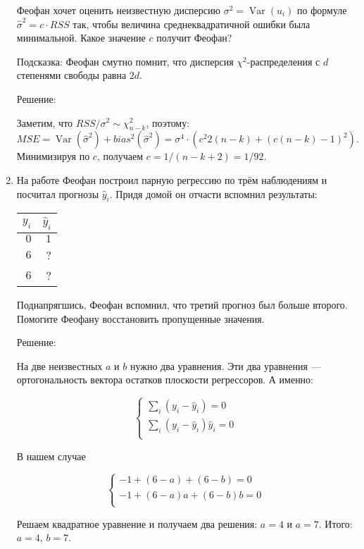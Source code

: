 \documentclass[12pt]{article} %
\DeclareMathOperator{\Var}{Var}
\def \hy{\hat{y}}
\begin{document}
\begin{enumerate}
Феофан хочет оценить неизвестную дисперсию $\sigma^2=\Var(u_i)$ по формуле $\hat{\sigma}^2 = c\cdot RSS$ так, чтобы величина среднеквадратичной ошибки была минимальной. Какое значение $c$ получит Феофан?

Подсказка: Феофан смутно помнит, что дисперсия $\chi^2$-распределения с $d$ степенями свободы равна $2d$.

Решение:

Заметим, что $RSS/\sigma^2 \sim \chi^2_{n-k}$, поэтому:
\[
MSE = \Var(\hat{\sigma}^2) + bias^2(\hat{\sigma}^2)=\sigma^4 \cdot (c^2 2(n-k) + (c(n-k)-1)^2).
\]
Минимизируя по $c$, получаем $c=1/(n-k+2) = 1/92$.



\item На работе Феофан построил парную регрессию по трём наблюдениям и посчитал прогнозы $\hat{y}_i$. Придя домой он отчасти вспомнил результаты:

\begin{tabular}{rr}
\toprule
$y_i$ & $\hy_i$ \\
\midrule
$0$ & $1$ \\
$6$ & ? \\
$6$ & ? \\
\bottomrule
\end{tabular}

Поднапрягшись, Феофан вспомнил, что третий прогноз был больше второго. Помогите Феофану восстановить пропущенные значения.

Решение:

На две неизвестных $a$ и $b$ нужно два уравнения. Эти два уравнения — ортогональность вектора остатков плоскости регрессоров. А именно:

\[
\begin{cases}
\sum_i (y_i - \hy_i) = 0 \\
\sum_i (y_i - \hy_i) \hy_i = 0 \\
\end{cases}
\]

В нашем случае

\[
\begin{cases}
-1 +(6-a) + (6-b) = 0 \\
-1 + (6 - a)a + (6-b)b = 0 \\
\end{cases}
\]

Решаем квадратное уравнение и получаем два решения: $a=4$ и $a=7$. Итого: $a=4$, $b=7$.


\end{enumerate}
\end{document}
